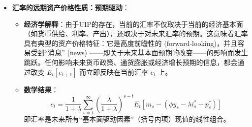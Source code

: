 \documentclass[12pt]{article}
\begin{document}
\begin{itemize}
\begin{itemize}
    \end{itemize}
    \item \textbf{汇率的远期资产价格性质：预期驱动}：
    \begin{itemize}
        \item \textbf{经济学解释}：由于UIP的存在，当前的汇率不仅取决于当前的经济基本面（如货币供给、利率、产出），还取决于对未来汇率的预期。这意味着汇率具有典型的资产价格特征：它是高度前瞻性的 (forward-looking)，并且容易受到“消息” (news) ——即关于未来基本面预期的改变——的影响而发生跳跃。任何影响未来货币政策、通货膨胀或经济增长预期的信息，都会通过改变 $E_t[e_{t+1}]$ 而立即反映在当前汇率 $e_t$ 上。
        \item \textbf{数学结果}：
        \[
        e_t = \frac{1}{1+\lambda} \sum_{s=t}^{\infty} \left(\frac{\lambda}{1+\lambda}\right)^{s-t} E_t[m_s - (\phi y_s - \lambda i_s^* - p_s^* )]
        \]
        即汇率是未来所有“基本面驱动因素”（括号内项）现值的线性组合。
    \end{itemize}
\end{itemize}
\end{document}
